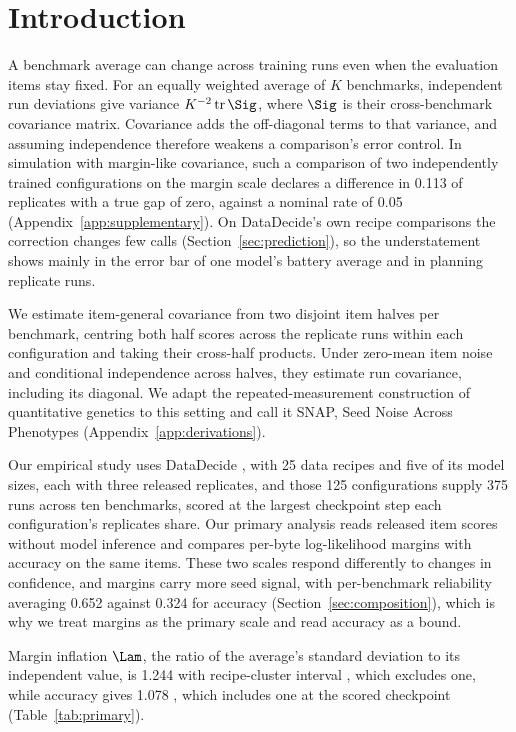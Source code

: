 \section{Introduction}
A benchmark average can change across training runs even when the evaluation items stay fixed. For an equally weighted average of $K$ benchmarks, independent run deviations give variance $K^{-2}\operatorname{tr}\Sig$, where $\Sig$ is their cross-benchmark covariance matrix. Covariance adds the off-diagonal terms to that variance, and assuming independence therefore weakens a comparison's error control. In simulation with margin-like covariance, such a comparison of two independently trained configurations on the margin scale declares a difference in 0.113 of replicates with a true gap of zero, against a nominal rate of 0.05 (Appendix~\ref{app:supplementary}). On DataDecide's own recipe comparisons the correction changes few calls (Section~\ref{sec:prediction}), so the understatement shows mainly in the error bar of one model's battery average and in planning replicate runs.

We estimate item-general covariance from two disjoint item halves per benchmark, centring both half scores across the replicate runs within each configuration and taking their cross-half products. Under zero-mean item noise and conditional independence across halves, they estimate run covariance, including its diagonal. We adapt the repeated-measurement construction of quantitative genetics to this setting and call it SNAP, Seed Noise Across Phenotypes (Appendix~\ref{app:derivations}).

Our empirical study uses DataDecide \citep{magnusson2025}, with 25 data recipes and five of its model sizes, each with three released replicates, and those 125 configurations supply 375 runs across ten benchmarks, scored at the largest checkpoint step each configuration's replicates share. Our primary analysis reads released item scores without model inference and compares per-byte log-likelihood margins with accuracy on the same items. These two scales respond differently to changes in confidence, and margins carry more seed signal, with per-benchmark reliability averaging 0.652 against 0.324 for accuracy (Section~\ref{sec:composition}), which is why we treat margins as the primary scale and read accuracy as a bound.

Margin inflation $\Lam$, the ratio of the average's standard deviation to its independent value, is 1.244 with recipe-cluster interval , which excludes one, while accuracy gives 1.078 , which includes one at the scored checkpoint (Table~\ref{tab:primary}).

